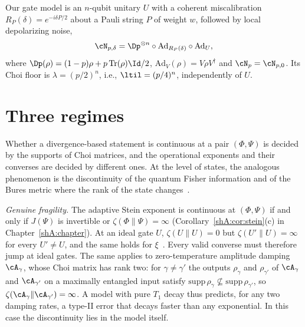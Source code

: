 Our gate model is an $n$-qubit unitary $U$ with a coherent miscalibration $R_P(\delta)=e^{-i\delta P/2}$ about a Pauli string $P$ of weight $w$, followed by local depolarizing noise,
\begin{equation}\label{gate:eq:gate}
\cN_{p,\delta}=\Dp^{\otimes n}\circ\mathrm{Ad}_{R_P(\delta)}\circ\mathrm{Ad}_U,
\end{equation}
where $\Dp(\rho)=(1-p)\rho+p\Tr(\rho)\Id/2$, $\mathrm{Ad}_V(\rho)=V\rho V^\dagger$ and $\cN_p=\cN_{p,0}$. Its Choi floor is $\lambda=(p/2)^n$, i.e., $\ltil=(p/4)^n$, independently of $U$.

\section{Three regimes}\label{gate:sec:regimes}

Whether a divergence-based statement is continuous at a pair $(\Phi,\Psi)$ is decided by the supports of Choi matrices, and the operational exponents and their converses are decided by different ones. At the level of states, the analogous phenomenon is the discontinuity of the quantum Fisher information and of the Bures metric where the rank of the state changes~\cite{Safranek2017,Seveso2020}.

\emph{Genuine fragility.} The adaptive Stein exponent is continuous at $(\Phi,\Psi)$ if and only if $J(\Psi)$ is invertible or $\zeta(\Phi\|\Psi)=\infty$ (Corollary~\ref{shA:cor:stein}(c) in Chapter~\ref{shA:chapter}). At an ideal gate $U$, $\zeta(U\|U)=0$ but $\zeta(U'\|U)=\infty$ for every $U'\neq U$, and the same holds for $\xi$~\cite{DuanFengYing2007}. Every valid converse must therefore jump at ideal gates. The same applies to zero-temperature amplitude damping $\cA_\gamma$, whose Choi matrix has rank two: for $\gamma\neq\gamma'$ the outputs $\rho_\gamma$ and $\rho_{\gamma'}$ of $\cA_\gamma$ and $\cA_{\gamma'}$ on a maximally entangled input satisfy $\mathrm{supp}\,\rho_\gamma\not\subseteq\mathrm{supp}\,\rho_{\gamma'}$, so $\zeta(\cA_\gamma\|\cA_{\gamma'})=\infty$. A model with pure $T_1$ decay thus predicts, for any two damping rates, a type-II error that decays faster than any exponential. In this case the discontinuity lies in the model itself.

